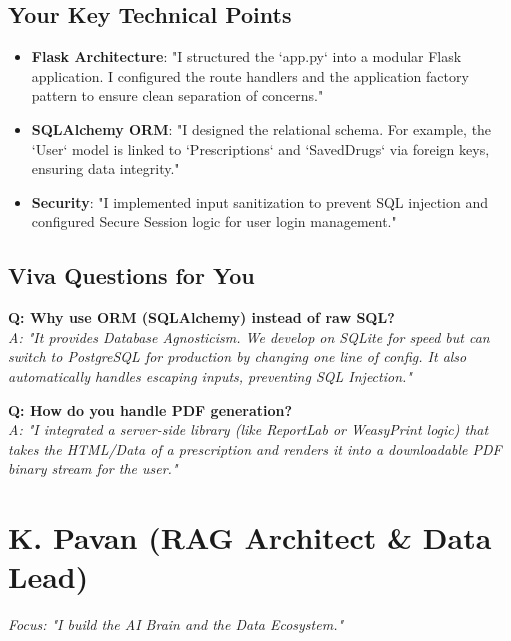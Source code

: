 \documentclass[a4paper,11pt]{report}
\begin{document}
\section{Your Key Technical Points}
\begin{itemize}
    \item \textbf{Flask Architecture}: "I structured the `app.py` into a modular Flask application. I configured the route handlers and the application factory pattern to ensure clean separation of concerns."
    \item \textbf{SQLAlchemy ORM}: "I designed the relational schema. For example, the `User` model is linked to `Prescriptions` and `SavedDrugs` via foreign keys, ensuring data integrity."
    \item \textbf{Security}: "I implemented input sanitization to prevent SQL injection and configured Secure Session logic for user login management."
\end{itemize}

\section{Viva Questions for You}
\textbf{Q: Why use ORM (SQLAlchemy) instead of raw SQL?} \\
\textit{A: "It provides Database Agnosticism. We develop on SQLite for speed but can switch to PostgreSQL for production by changing one line of config. It also automatically handles escaping inputs, preventing SQL Injection."}

\textbf{Q: How do you handle PDF generation?} \\
\textit{A: "I integrated a server-side library (like ReportLab or WeasyPrint logic) that takes the HTML/Data of a prescription and renders it into a downloadable PDF binary stream for the user."}

\newpage

\chapter{K. Pavan (RAG Architect \& Data Lead)}
\textit{Focus: "I build the AI Brain and the Data Ecosystem."}
\end{document}
